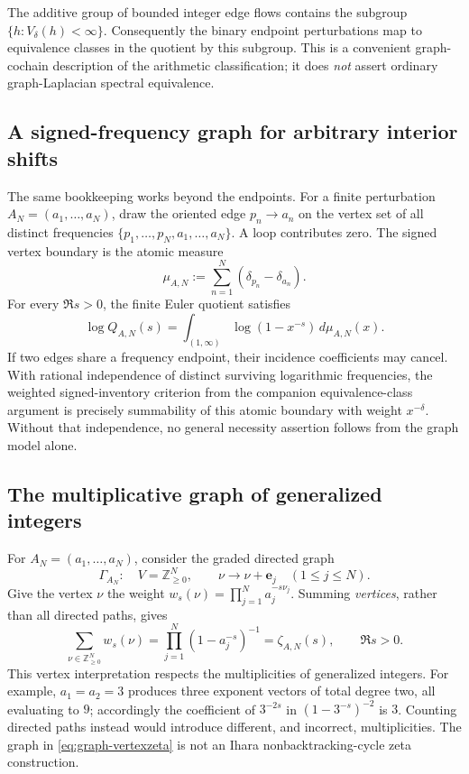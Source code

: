The additive group of bounded integer edge flows contains the subgroup
\(\{h:V_\delta(h)<\infty\}\).
Consequently the binary endpoint perturbations map to equivalence
classes in the quotient by this subgroup.  This is a convenient
graph-cochain description of the arithmetic classification; it does
\emph{not} assert ordinary graph-Laplacian spectral equivalence.

\subsection{A signed-frequency graph for arbitrary interior shifts}

The same bookkeeping works beyond the endpoints.  For a finite
perturbation \(A_N=(a_1,\ldots,a_N)\), draw the oriented edge
\(p_n\to a_n\) on the vertex set of all distinct frequencies
\(\{p_1,\ldots,p_N,a_1,\ldots,a_N\}\).  A loop contributes zero.
The signed vertex boundary is the atomic measure
\[
 \mu_{A,N}:=\sum_{n=1}^N(\delta_{p_n}-\delta_{a_n}).
\]
For every \(\Re s>0\), the finite Euler quotient satisfies
\begin{equation}\label{eq:graph-atomic}
 \log Q_{A,N}(s)=
 \int_{(1,\infty)}\log(1-x^{-s})\,d\mu_{A,N}(x).
\end{equation}
If two edges share a frequency endpoint, their incidence
coefficients may cancel.  With rational independence of distinct
surviving logarithmic frequencies, the weighted signed-inventory
criterion from the companion equivalence-class argument is precisely
summability of this atomic boundary with weight \(x^{-\delta}\).
Without that independence, no general necessity assertion follows
from the graph model alone.

\subsection{The multiplicative graph of generalized integers}

For \(A_N=(a_1,\ldots,a_N)\), consider the graded directed graph
\[
 \Gamma_{A_N}:\quad
 V=\mathbb Z_{\ge0}^{N},\qquad
 \nu\longrightarrow \nu+\mathbf e_j\quad(1\le j\le N).
\]
Give the vertex \(\nu\) the weight
\(w_s(\nu)=\prod_{j=1}^N a_j^{-s\nu_j}\).
Summing \emph{vertices}, rather than all directed paths, gives
\begin{equation}\label{eq:graph-vertexzeta}
 \sum_{\nu\in\mathbb Z_{\ge0}^N}w_s(\nu)
 =\prod_{j=1}^N(1-a_j^{-s})^{-1}
 =\zeta_{A,N}(s),\qquad\Re s>0.
\end{equation}
This vertex interpretation respects the multiplicities of
generalized integers.  For example, \(a_1=a_2=3\) produces
three exponent vectors of total degree two, all evaluating to \(9\);
accordingly the coefficient of \(3^{-2s}\) in
\((1-3^{-s})^{-2}\) is \(3\).  Counting directed paths instead
would introduce different, and incorrect, multiplicities.
The graph in \eqref{eq:graph-vertexzeta} is not an Ihara
nonbacktracking-cycle zeta construction.

